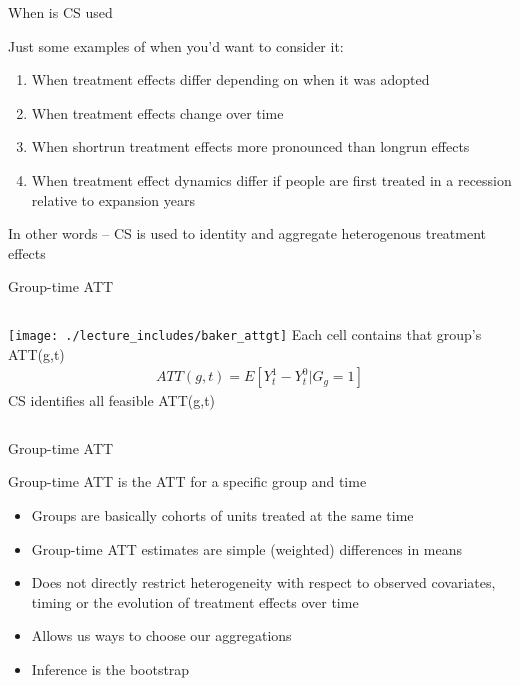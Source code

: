 \documentclass{beamer}
\begin{document}
\begin{frame}{When is CS used}

Just some examples of when you'd want to consider it:
\begin{enumerate}
\item When treatment effects differ depending on when it was adopted
\item When treatment effects change over time
\item When shortrun treatment effects more pronounced than longrun effects
\item When treatment effect dynamics differ if people are first treated in a recession relative to expansion years
\end{enumerate}

\bigskip

In other words -- CS is used to identity and aggregate heterogenous treatment effects

\end{frame}






\begin{frame}{Group-time ATT}
       \begin{columns}
             \centering
             \texttt{[image: ./lecture\_includes/baker\_attgt]}
            Each cell contains that group's ATT(g,t)
\begin{eqnarray*}
ATT(g,t) = E[Y_t^1 - Y_t^0 | G_g=1]
\end{eqnarray*}CS identifies all feasible ATT(g,t)
         \end{columns} 
    \end{frame}




\begin{frame}{Group-time ATT}

Group-time ATT is the ATT for a specific group and time
\begin{itemize}
\item Groups are basically cohorts of units treated at the same time
\item Group-time ATT estimates are simple (weighted) differences in means
\item Does not directly restrict heterogeneity with respect to observed covariates, timing or the evolution of treatment effects over time
\item Allows us ways to choose our aggregations
\item Inference is the bootstrap
\end{itemize}

\end{frame}
\end{document}

